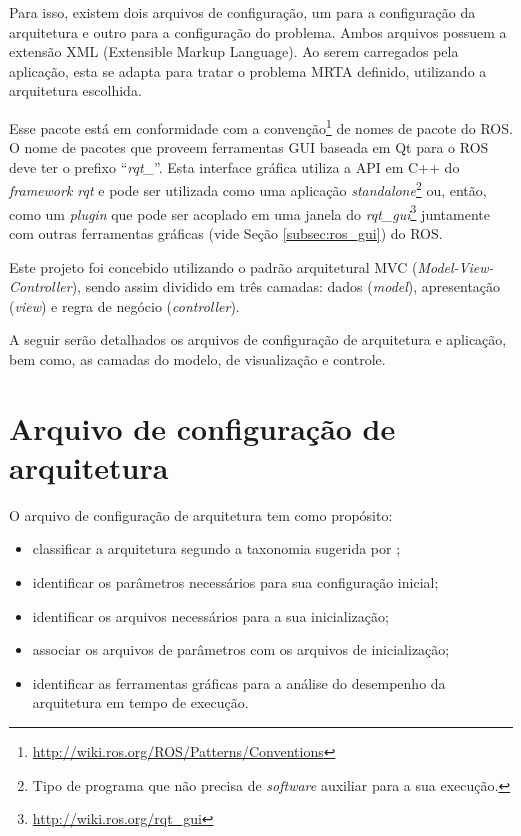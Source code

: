     Para isso, existem dois arquivos de configuração, um para a configuração da arquitetura e outro para a configuração do problema. Ambos arquivos possuem a extensão XML (Extensible Markup Language). Ao serem carregados pela aplicação, esta se adapta para tratar o problema MRTA definido, utilizando a arquitetura escolhida. 
    
    Esse pacote está em conformidade com a convenção\footnote{\url{http://wiki.ros.org/ROS/Patterns/Conventions}} de nomes de pacote do ROS. O nome de pacotes que proveem ferramentas GUI baseada em Qt para o ROS deve ter o prefixo ``\textit{rqt\_}''. Esta interface gráfica utiliza a API em C++ do \textit{framework rqt} e pode ser utilizada como uma aplicação \textit{standalone}\footnote{Tipo de programa que não precisa de \textit{software} auxiliar para a sua execução.} ou, então, como um \textit{plugin} que pode ser acoplado em uma janela do \textit{rqt\_gui}\footnote{\url{http://wiki.ros.org/rqt_gui}} juntamente com outras ferramentas gráficas (vide Seção \ref{subsec:ros_gui}) do ROS.
    
    Este projeto foi concebido utilizando o padrão arquitetural MVC (\textit{Model-View-Controller}), sendo assim dividido em três camadas: dados (\textit{model}), apresentação (\textit{view}) e regra de negócio (\textit{controller}).
    
    A seguir serão detalhados os arquivos de configuração de arquitetura e aplicação, bem como, as camadas do modelo, de visualização e controle.
        
    \section{Arquivo de configuração de arquitetura} \label{sec:arch_config}
        O arquivo de configuração de arquitetura tem como propósito:
        
        \begin{itemize}
            \item classificar a arquitetura segundo a taxonomia sugerida por ;
            \item identificar os parâmetros necessários para sua configuração inicial;
            \item identificar os arquivos necessários para a sua inicialização;
            \item associar os arquivos de parâmetros com os arquivos de inicialização;
            \item identificar as ferramentas gráficas para a análise do desempenho da arquitetura em tempo de execução.
        \end{itemize}
        
